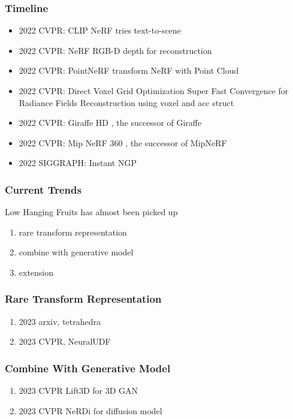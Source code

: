 \documentclass[10pt, hyperref={colorlinks=true,linkcolor=blue},xcolor=dvipsnames]{beamer}
\begin{document}
\begin{frame}
    \frametitle{Timeline}
    \begin{itemize}
        \item 2022 CVPR: CLIP NeRF\cite{wangCLIPNeRFTextandImageDriven2022} tries text-to-scene
        \item 2022 CVPR: NeRF RGB-D\cite{azinovicNeuralRGBDSurface2022} depth for reconstruction
        \item 2022 CVPR: PointNeRF\cite{xuPointNeRFPointbasedNeurala} transform NeRF with Point Cloud
        \item 2022 CVPR: Direct Voxel Grid Optimization Super Fast Convergence for Radiance  Fields Reconstruction \cite{sunDirectVoxelGrid2022} using voxel and acc struct
        \item 2022 CVPR: Giraffe HD \cite{xueGIRAFFEHDHighResolution2022}, the successor of Giraffe\cite{niemeyerGIRAFFERepresentingScenes2021}
        \item 2022 CVPR: Mip NeRF 360 \cite{barronMipNeRF360Unbounded2022}, the successor of MipNeRF\cite{barronMipNeRFMultiscaleRepresentation2021}
        \item 2022 SIGGRAPH: Instant NGP \cite{mullerInstantNeuralGraphics2022}
    \end{itemize}
\end{frame}


\begin{frame}
    \frametitle{Current Trends}
    Low Hanging Fruits has almost been picked up
    \begin{enumerate}
        \item rare transform representation
        \item combine with generative model
        \item extension
    \end{enumerate}
\end{frame}


\begin{frame}
    \frametitle{Rare Transform Representation}
    \begin{enumerate}
        \item 2023 arxiv, tetrahedra\cite{kulhanekTetraNeRFRepresentingNeural2023}
        \item 2023 CVPR, NeuralUDF\cite{liuNeUDFLeaningNeural2023}
    \end{enumerate}
\end{frame}

\begin{frame}
    \frametitle{Combine With Generative Model}
    \begin{enumerate}
        \item 2023 CVPR Lift3D \cite{liLift3DSynthesize3D2023} for 3D GAN
        \item 2023 CVPR NeRDi \cite{dengNeRDiSingleViewNeRF2022} for diffusion model
    \end{enumerate}
\end{frame}
\end{document}
